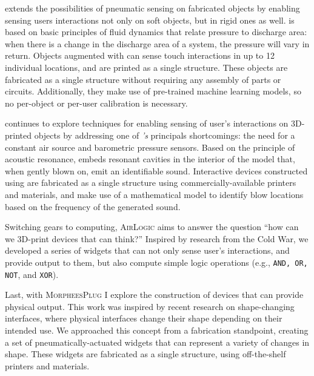         \textsc{\at} extends the possibilities of pneumatic sensing on
        fabricated objects by enabling sensing users interactions not only on
        soft objects, but in rigid ones as well. \emph{\at} is based on basic
        principles of fluid dynamics that relate pressure to discharge area:
        when there is a change in the discharge area of a system, the pressure
        will vary in return. Objects augmented with \emph{\at} can sense touch
        interactions in up to 12 individual locations, and are printed as a
        single structure. These objects are fabricated as a single structure
        without requiring any assembly of parts or circuits. Additionally, they
        make use of pre-trained machine learning models, so no per-object or
        per-user calibration is necessary.
        
        \textsc{\bh} continues to explore techniques for enabling sensing of
        user's interactions on 3D-printed objects by addressing one of
        \emph{\at's} principals shortcomings: the need for a constant air source
        and barometric pressure sensors. Based on the principle of acoustic
        resonance, \emph{\bh} embeds resonant cavities in the interior of the
        model that, when gently blown on, emit an identifiable sound.
        Interactive devices constructed using \emph{\bh} are fabricated as a
        single structure using commercially-available printers and materials,
        and make use of a mathematical model to identify blow locations based on
        the frequency of the generated sound.

        Switching gears to computing, \textsc{AirLogic} aims to answer the
        question ``how can we 3D-print devices that can think?'' Inspired by
        research from the Cold War, we developed a series of widgets that can
        not only sense user's interactions, and provide output to them, but also
        compute simple logic operations (e.g., \texttt{AND, OR, NOT}, and
        \texttt{XOR}).

        Last, with \textsc{MorpheesPlug} I explore the construction of devices
        that can provide physical output. This work was inspired by recent
        research on shape-changing interfaces, where physical interfaces change
        their shape depending on their intended use. We approached this concept
        from a fabrication standpoint, creating a set of pneumatically-actuated
        widgets that can represent a variety of changes in shape. These widgets
        are fabricated as a single structure, using off-the-shelf printers and
        materials.